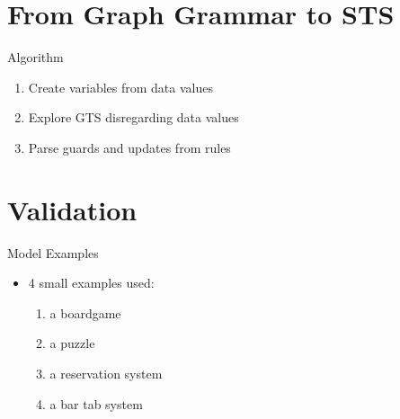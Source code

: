 \documentclass{FMTslides}
\begin{document}
\section[GG2STS]{From Graph Grammar to STS}

\begin{frame}{Algorithm}
\begin{enumerate}
\item Create variables from data values
\item Explore GTS disregarding data values
\item Parse guards and updates from rules
\end{enumerate}
\begin{figure}
\centering
    \hspace{10px}
    \hspace{10px}
\end{figure}
\end{frame}


\section[Validation]{Validation}

\begin{frame}{Model Examples}
\begin{itemize}
  \item 4 small examples used:
  \begin{enumerate}
    \item a boardgame
    \item a puzzle
    \item a reservation system
    \item a bar tab system
  \end{enumerate}
\end{itemize}
\end{frame}
\end{document}
